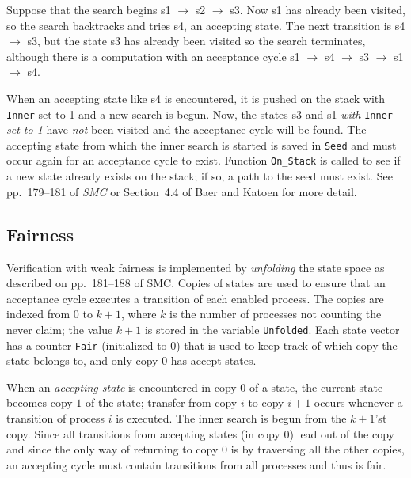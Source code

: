 \documentclass[11pt]{article}
\newcommand*{\smc}{\textit{SMC}}
\newcommand*{\p}[1]{\texttt{#1}}
\begin{document}
Suppose that the search begins \textsf{s1} $\rightarrow$ \textsf{s2}
$\rightarrow$ \textsf{s3}. Now \textsf{s1} has already been visited, so
the search backtracks and tries \textsf{s4}, an accepting state. The
next transition is \textsf{s4} $\rightarrow$ \textsf{s3}, but the state
\textsf{s3} has already been visited so the search terminates, although
there is a computation with an acceptance cycle \textsf{s1}
$\rightarrow$ \textsf{s4} $\rightarrow$ \textsf{s3} $\rightarrow$
\textsf{s1} $\rightarrow$ \textsf{s4}.

When an accepting state like \textsf{s4} is encountered, it is pushed on
the stack with \p{Inner} set to 1 and a new search is begun. Now, the
states \textsf{s3} and \textsf{s1} \textit{with} \p{Inner} \textit{set
to 1} have \emph{not} been visited and the acceptance cycle will be
found. The accepting state from which the inner search is started is
saved in \p{Seed} and must occur again for an acceptance cycle to exist.
Function \p{On\_Stack} is called to see if a new state already exists on
the stack; if so, a path to the seed must exist. See pp.~179--181 of
\smc{} or Section~4.4 of Baer and Katoen for more detail.

\subsection{Fairness}\label{s.fair}
Verification with weak fairness is implemented by \emph{unfolding} the
state space as described on pp.~181--188 of SMC. Copies of states are
used to ensure that an acceptance cycle executes a transition of each
enabled process. The copies are indexed from $0$ to $k+1$, where $k$ is
the number of processes not counting the never claim; the value $k+1$ is
stored in the variable \p{Unfolded}. Each state vector has a counter
\p{Fair} (initialized to $0$) that is used to keep track of which copy
the state belongs to, and only copy $0$ has accept states.

When an \emph{accepting state} is encountered in copy $0$ of a state,
the current state becomes copy $1$ of the state; transfer from copy $i$
to copy $i+1$ occurs whenever a transition of process $i$ is executed.
The inner search is begun from the $k+1$'st copy. Since all transitions
from accepting states (in copy $0$) lead out of the copy and since the only
way of returning to copy $0$ is by traversing all the other copies, an
accepting cycle must contain transitions from all processes and thus is
fair.
\end{document}
